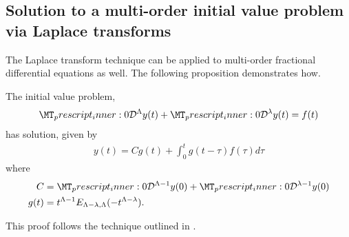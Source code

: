 \subsection{Solution to a multi-order initial value problem via Laplace transforms}
The Laplace transform technique can be applied to multi-order fractional differential equations as well. The following proposition demonstrates how.
\begin{mdframed}[innertopmargin=10pt]
\begin{lemma}
	The initial value problem,
	\begin{align}
	    \label{eq:fde-multi-order}
	    \prescript{}{0}{\mathcal{D}}^{\Lambda}y(t) + \prescript{}{0}{\mathcal{D}}^{\lambda}y(t) = f(t)
	\end{align}
	has solution, given by
	\begin{align}
		y(t) = C g(t) + \int_0^t g(t-\tau)f(\tau) d\tau
	\end{align}
where
	\begin{align}
		C &= \prescript{}{0}{\mathcal{D}}^{\Lambda-1}y(0) + \prescript{}{0}{\mathcal{D}}^{\lambda-1}y(0) \\
		g(t) &= t^{\Lambda - 1} E_{\Lambda - \lambda, \Lambda}(-t^{\Lambda - \lambda}).
	\end{align}
\end{lemma}
\end{mdframed}
This proof follows the technique outlined in \cite{Podlubny1999}.
